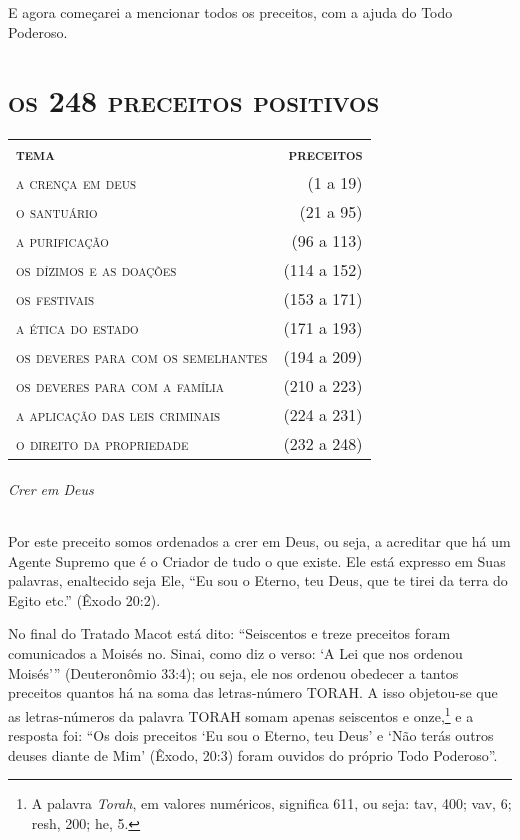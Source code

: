 E agora começarei a mencionar todos os preceitos, com a ajuda do Todo
Poderoso.

\begingroup\makeatletter\@openrightfalse
\part{\textsc{os 248 preceitos positivos}}

\vspace*{\fill}
\thispagestyle{empty}
\begin{tabular}{lr}
\textbf{\textsc{tema}} & \textbf{\textsc{preceitos}} \\
\textsc{a crença em deus} & (1 a 19) \\
\textsc{o santuário} & (21 a 95) \\
\textsc{a purificação} & (96 a 113) \\
\textsc{os dízimos e as doações} & (114 a 152) \\
\textsc{os festivais} & (153 a 171) \\
\textsc{a ética do estado} & (171 a 193) \\
\textsc{os deveres para com os semelhantes} & (194 a 209) \\
\textsc{os deveres para com a família} & (210 a 223) \\
\textsc{a aplicação das leis criminais} & (224 a 231) \\
\textsc{o direito da propriedade} & (232 a 248)
\end{tabular}

\@openrighttrue\makeatother \endgroup

\pagebreak
\movetooddpage


\setcounter{paragraph}{0}
\setcounter{secnumdepth}{4}

\paragraph{Crer em Deus}

Por este preceito somos ordenados a crer em Deus, ou seja, a acreditar
que há um Agente Supremo que é o Criador de tudo o que existe. Ele está
expresso em Suas palavras, enaltecido seja Ele, ``Eu sou o Eterno, teu
Deus, que te tirei da terra do Egito etc.'' (Êxodo 20:2).

No final do Tratado Macot está dito: ``Seiscentos e treze preceitos
foram comunicados a Moisés no. Sinai, como diz o verso: `A Lei que nos
ordenou Moisés''' (Deuteronômio 33:4); ou seja, ele nos ordenou obedecer a
tantos preceitos quantos há na soma das letras-número TORAH. A isso
objetou-se que as letras-números da palavra TORAH somam apenas seiscentos e
onze,\footnote{A palavra \emph{Torah}, em valores numéricos, significa 611, ou
seja: tav, 400; vav, 6; resh, 200; he, 5.} e a resposta foi: ``Os dois preceitos `Eu sou o Eterno, teu Deus' e `Não terás outros
deuses diante de Mim' (Êxodo, 20:3) foram ouvidos do próprio Todo
Poderoso''.


